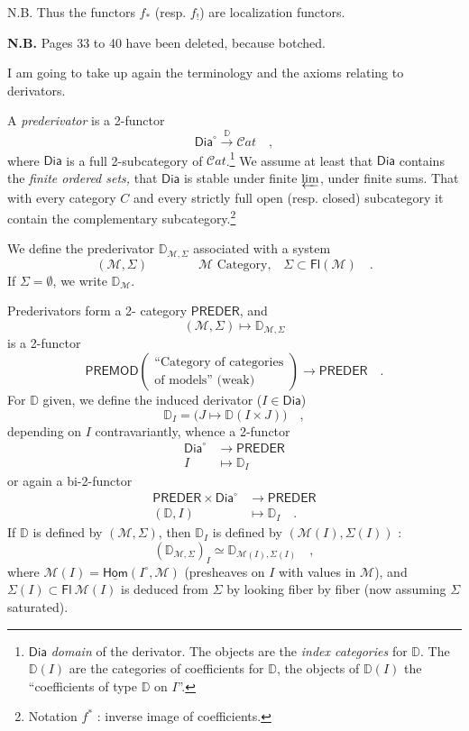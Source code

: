 \documentclass[11pt]{article}
\newcommand{\printedpage}[1]{\marginpar{\footnotesize p.~#1}}
\newcommand{\msp}[1]{\marginpar{\footnotesize [#1]}}
\newcommand{\sDia}{\mathsf{Dia}}
\newcommand{\DD}{\mathbb{D}}
\begin{document}
N.B. Thus the functors $f_*$ (resp. $f_!$) are localization functors.

\textbf{N.B.} Pages 33 to 40 have been deleted, because botched. %

\msp{page 41}
I am going to take up again the terminology and the axioms relating to derivators.

A \textit{prederivator} is a 2-functor
\[ \sDia^\circ \xrightarrow{\DD} \mathcal{C}at \quad , \]
where $\sDia$ is a full 2-subcategory of $\mathcal{C}at$.\footnote[11]{$\sDia$ \textit{domain} of the derivator. The objects are the \textit{index categories} for $\DD$. The $\DD(I)$ are the categories of coefficients for $\DD$, the objects of $\DD(I)$ the ``coefficients of type $\DD$ on $I$''. %
} We assume at least that $\sDia$ contains the \textit{finite ordered sets,} that $\sDia$ is stable under finite $\varprojlim$, under finite sums. That with every category $C$ and every strictly full open (resp. closed) subcategory it contain the complementary subcategory.\footnote[12]{Notation $f^*$ : inverse image of coefficients.}

\printedpage{23}
\msp{page 42}
We define the prederivator $\DD_{\mathcal{M},\Sigma}$ associated with a system
\[ (\mathcal{M},\Sigma) \qquad\qquad \mathcal{M} \text{ Category,} \quad \Sigma \subset \mathsf{Fl}(\mathcal{M}) \quad . \] %
If $\Sigma = \emptyset$, we write $\DD_{\mathcal{M}}$.

Prederivators form a 2- category $\mathsf{PREDER}$, and
\[ (\mathcal{M},\Sigma) \longmapsto \DD_{\mathcal{M},\Sigma} \]
is a 2-functor
\[ \mathsf{PREMOD}
\begin{pmatrix}
\text{``Category of categories} \\
\text{of models'' (weak)}
\end{pmatrix}
\longrightarrow \mathsf{PREDER} \quad . \]
For $\DD$ given, we define the induced derivator ($I \in \sDia$)
\[ \DD_I = \big(J \longmapsto \DD(I \times J)\big) \quad , \]
depending on $I$ contravariantly, whence a 2-functor
\[ \begin{aligned}
\sDia^\circ &\longrightarrow \mathsf{PREDER} \\
I &\longmapsto \DD_I
\end{aligned} \]
or again a bi-2-functor
\[ \begin{aligned}
\mathsf{PREDER} \times \sDia^\circ &\longrightarrow \mathsf{PREDER} \\
(\DD, I) &\longmapsto \DD_I \quad .
\end{aligned} \]
If $\DD$ is defined by $(\mathcal{M},\Sigma)$, then $\DD_I$ is defined by $(\mathcal{M}(I),\Sigma(I))$ :
\[ (\DD_{\mathcal{M},\Sigma})_I \simeq \DD_{\mathcal{M}(I),\Sigma(I)} \quad , \]
\msp{page 43}
where $\mathcal{M}(I) = \underline{\mathsf{Hom}}(I^\circ,\mathcal{M})$ (presheaves on $I$ with values in $\mathcal{M}$), and $\Sigma(I) \subset \mathsf{Fl}\ \mathcal{M}(I)$ is deduced from $\Sigma$ by looking fiber by fiber (now assuming $\Sigma$ saturated). %
\end{document}
